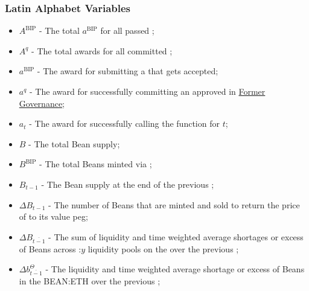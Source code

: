 \documentclass[class=article, crop=false]{standalone}
\begin{document}
\subsubsection{Latin Alphabet Variables}

\begin{itemize}[topsep=0pt, itemsep=3pt,leftmargin=16pt]
    \item[] $A^{\text{BIP}}$ - \hypertarget{ht7}{The total $a^{\text{BIP}}$ for all passed };
    \item[] $A^q$ - \hypertarget{ht8}{The total awards for all committed };
    \item[] $a^{\text{BIP}}$ - \hypertarget{ht9}{The award for submitting a  that gets accepted};
    \item[] $a^q$ - \hypertarget{ht10}{The award for successfully committing an approved  in \hyperlink{subsection.14.3}{Former Governance}};
    \item[] $a_t$ - \hypertarget{ht11}{The award for successfully calling the  function for $t$};
    \item[] $B$ - \hypertarget{ht16}{The total Bean supply};
    \item[] $B^{\text{BIP}}$ - \hypertarget{ht17}{The total Beans minted via };
    \item[] $B_{t-1}$ - The Bean supply at the end of the previous ;
    \item[] $\Delta B_{t-1}$ - \hypertarget{ht49}{The number of Beans that are minted and sold to return the price of  to its value peg};
    \item[] $\Delta B_{\overline{t-1}}$ - \hypertarget{ht50}{The sum of liquidity and time weighted average shortages or excess of Beans across \Bean:$y$ liquidity pools on the  over the previous };
    \item[] $\Delta b_{\overline{t-1}}^{\Theta}$ - The liquidity and time weighted average shortage or excess of Beans in the BEAN:ETH  over the previous ;


\end{itemize}
\end{document}
